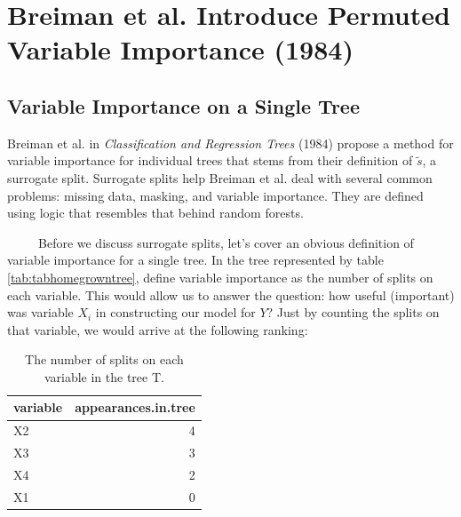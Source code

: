 \documentclass[12pt,twoside]{reedthesis}
\begin{document}
  \section{Breiman et al. Introduce Permuted Variable Importance
  (1984)}\label{breiman-et-al.-introduce-permuted-variable-importance-1984}
  
  \subsection{Variable Importance on a Single
  Tree}\label{variable-importance-on-a-single-tree}
  
  Breiman et al. in \emph{Classification and Regression Trees} (1984)
  propose a method for variable importance for individual trees that stems
  from their definition of \(\tilde{s}\), a surrogate split. Surrogate
  splits help Breiman et al. deal with several common problems: missing
  data, masking, and variable importance. They are defined using logic
  that resembles that behind random forests.
  
  ~~~~~Before we discuss surrogate splits, let's cover an obvious
  definition of variable importance for a single tree. In the tree
  represented by table \ref{tab:tabhomegrowntree}, define variable
  importance as the number of splits on each variable. This would allow us
  to answer the question: how useful (important) was variable \(X_i\) in
  constructing our model for \(Y\)? Just by counting the splits on that
  variable, we would arrive at the following ranking:
  
  \begin{table}
  
  \caption{\label{tab:unnamed-chunk-24}\label{tab:tabbvi}The number of splits on each variable in the tree T.}
  \centering
  \begin{tabular}[t]{l|r}
  \hline
  variable & appearances.in.tree\\
  \hline
  X2 & 4\\
  \hline
  X3 & 3\\
  \hline
  X4 & 2\\
  \hline
  X1 & 0\\
  \hline
  \end{tabular}
  \end{table}
  
\end{document}
